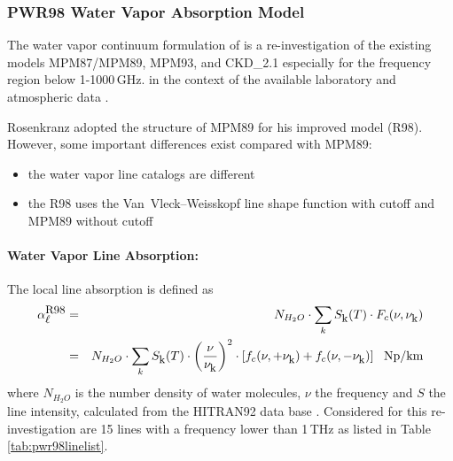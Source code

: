 \subsubsection{PWR98 Water Vapor Absorption Model}
\label{leveld:pwr98_h2o}
The water vapor continuum formulation of \citet{pwr:98} is a re-investigation 
of the existing models MPM87/MPM89, MPM93, and CKD\_2.1 especially for 
the frequency region below 1-1000\,GHz. in the context of the available
laboratory and atmospheric data \citep{abaueretal:89, abaueretal:93, 
abaueretal:95, beckerautler:46, englishetal:94, godonetal:92,
liebe:84, liebeandlayton:87, westwateretal:90}.

Rosenkranz adopted the structure of MPM89 for his improved model (R98). 
However, some important differences exist compared with MPM89:
\begin{itemize}
\item the water vapor line catalogs are different 
\item the R98 uses the Van~Vleck--Weisskopf line shape function with 
      cutoff and MPM89 without cutoff
\end{itemize}


\paragraph{Water Vapor Line Absorption:}
\label{levele:pwr98_h2oline}
The local line absorption is defined as 
\begin{eqnarray} 
 \label{eq:pwr98absline}
 \alpha^{\mbox{\rm \small R98}}_{\mbox{\small $\ell$}} &=& N_{H_2O} \cdot \sum_k S_{\mbox{\rm \small k}}(T) \cdot F_{c}(\nu,\nu_{\mbox{\rm \small k}}) \nonumber\\
            &=& N_{H_2O} \cdot \sum_k S_{\mbox{\rm \small k}}(T) \cdot 
                \left (\displaystyle{\frac{\nu}{\nu_{\mbox{\rm \small k}}}}\right )^2  \cdot 
                \left [f_{c}(\nu,+\nu_{\mbox{\rm \small k}}) + f_{c}(\nu,-\nu_{\mbox{\rm \small k}}) \right]~~\mbox{Np/km}
\end{eqnarray}
where $N_{H_2O}$ is the number density of water molecules, $\nu$ the
frequency and $S$ the line intensity, calculated from the HITRAN92
data base \citet{rothman:92}. Considered for this re-investigation are 
15 lines with a frequency lower than 1\,THz as listed in 
Table \ref{tab:pwr98linelist}.

